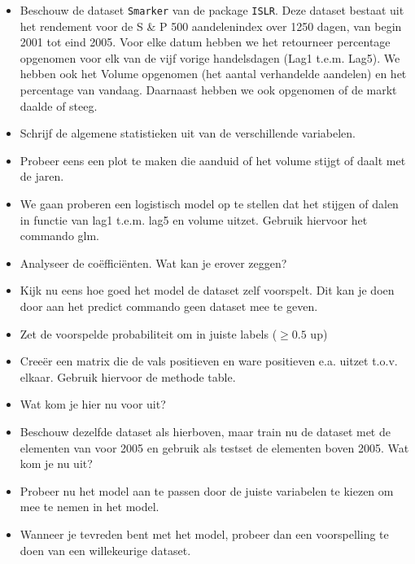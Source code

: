 \begin{exercise}
	
	\begin{itemize}
		\item Beschouw de dataset \texttt{Smarker} van de package \texttt{ISLR}. 
		Deze dataset bestaat uit
		het rendement voor de S \& P 500 aandelenindex over 1250 dagen, van 
		begin 2001 tot eind 2005. Voor elke datum hebben we het  retourneer percentage opgenomen voor elk van de vijf vorige handelsdagen (Lag1 t.e.m. Lag5). We hebben ook het Volume opgenomen (het aantal verhandelde aandelen) en het percentage van vandaag. Daarnaast hebben we ook opgenomen of de markt daalde of steeg.
		\item Schrijf de algemene statistieken uit van de verschillende variabelen. 
		\item Probeer eens een plot te maken die aanduid of het volume stijgt of daalt met de jaren. 
		\item We gaan proberen een logistisch model op te stellen dat het stijgen of dalen in functie van lag1 t.e.m. lag5 en volume uitzet. Gebruik hiervoor het commando glm.
		\item Analyseer de co\"effici\"enten. Wat kan je erover zeggen?
		\item Kijk nu eens hoe goed het model de dataset zelf voorspelt. Dit kan je doen door aan het predict commando geen dataset mee te geven. 
		\item Zet de voorspelde probabiliteit om in juiste labels ($\geq 0.5$ up)
		\item  Cree\"er een matrix die de vals positieven en ware positieven e.a. uitzet t.o.v. elkaar. Gebruik hiervoor de methode table. 
		\item Wat kom je hier nu voor uit?
	\end{itemize}
\end{exercise}

\begin{exercise}
	
	\begin{itemize}
		\item Beschouw dezelfde dataset als hierboven, maar train nu de dataset met de elementen van voor 2005 en gebruik als testset de elementen boven 2005. Wat kom je nu uit?
		\item Probeer nu het model aan te passen door de juiste variabelen te kiezen om mee te nemen in het model. 
		\item Wanneer je tevreden bent met het model, probeer dan een voorspelling te doen van een willekeurige dataset.
	\end{itemize}
\end{exercise}

